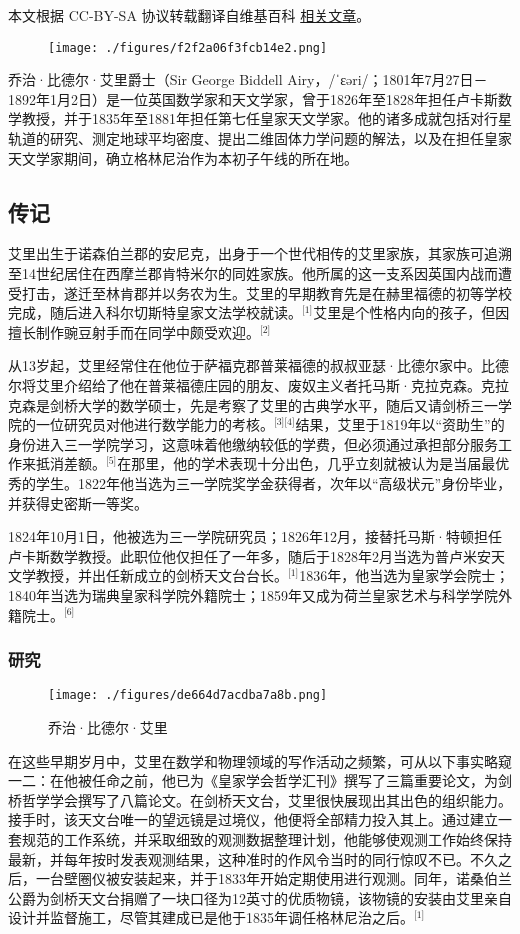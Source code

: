 
本文根据 CC-BY-SA 协议转载翻译自维基百科 \href{https://en.wikipedia.org/wiki/George_Biddell_Airy}{相关文章}。

\begin{figure}[ht]
\centering
\texttt{[image: ./figures/f2f2a06f3fcb14e2.png]}
\caption{} \label{fig_AL_1}
\end{figure}
乔治·比德尔·艾里爵士（Sir George Biddell Airy，/ˈɛəri/；1801年7月27日－1892年1月2日）是一位英国数学家和天文学家，曾于1826年至1828年担任卢卡斯数学教授，并于1835年至1881年担任第七任皇家天文学家。他的诸多成就包括对行星轨道的研究、测定地球平均密度、提出二维固体力学问题的解法，以及在担任皇家天文学家期间，确立格林尼治作为本初子午线的所在地。
\subsection{传记}
艾里出生于诺森伯兰郡的安尼克，出身于一个世代相传的艾里家族，其家族可追溯至14世纪居住在西摩兰郡肯特米尔的同姓家族。他所属的这一支系因英国内战而遭受打击，遂迁至林肯郡并以务农为生。艾里的早期教育先是在赫里福德的初等学校完成，随后进入科尔切斯特皇家文法学校就读。\(^\text{[1]}\)艾里是个性格内向的孩子，但因擅长制作豌豆射手而在同学中颇受欢迎。\(^\text{[2]}\)

从13岁起，艾里经常住在他位于萨福克郡普莱福德的叔叔亚瑟·比德尔家中。比德尔将艾里介绍给了他在普莱福德庄园的朋友、废奴主义者托马斯·克拉克森。克拉克森是剑桥大学的数学硕士，先是考察了艾里的古典学水平，随后又请剑桥三一学院的一位研究员对他进行数学能力的考核。\(^\text{[3][4]}\)结果，艾里于1819年以“资助生”的身份进入三一学院学习，这意味着他缴纳较低的学费，但必须通过承担部分服务工作来抵消差额。\(^\text{[5]}\)在那里，他的学术表现十分出色，几乎立刻就被认为是当届最优秀的学生。1822年他当选为三一学院奖学金获得者，次年以“高级状元”身份毕业，并获得史密斯一等奖。

1824年10月1日，他被选为三一学院研究员；1826年12月，接替托马斯·特顿担任卢卡斯数学教授。此职位他仅担任了一年多，随后于1828年2月当选为普卢米安天文学教授，并出任新成立的剑桥天文台台长。\(^\text{[1]}\)1836年，他当选为皇家学会院士；1840年当选为瑞典皇家科学院外籍院士；1859年又成为荷兰皇家艺术与科学学院外籍院士。\(^\text{[6]}\)
\subsubsection{研究}
\begin{figure}[ht]
\centering
\texttt{[image: ./figures/de664d7acdba7a8b.png]}
\caption{乔治·比德尔·艾里} \label{fig_AL_2}
\end{figure}
在这些早期岁月中，艾里在数学和物理领域的写作活动之频繁，可从以下事实略窥一二：在他被任命之前，他已为《皇家学会哲学汇刊》撰写了三篇重要论文，为剑桥哲学学会撰写了八篇论文。在剑桥天文台，艾里很快展现出其出色的组织能力。接手时，该天文台唯一的望远镜是过境仪，他便将全部精力投入其上。通过建立一套规范的工作系统，并采取细致的观测数据整理计划，他能够使观测工作始终保持最新，并每年按时发表观测结果，这种准时的作风令当时的同行惊叹不已。不久之后，一台壁圈仪被安装起来，并于1833年开始定期使用进行观测。同年，诺桑伯兰公爵为剑桥天文台捐赠了一块口径为12英寸的优质物镜，该物镜的安装由艾里亲自设计并监督施工，尽管其建成已是他于1835年调任格林尼治之后。\(^\text{[1]}\)

